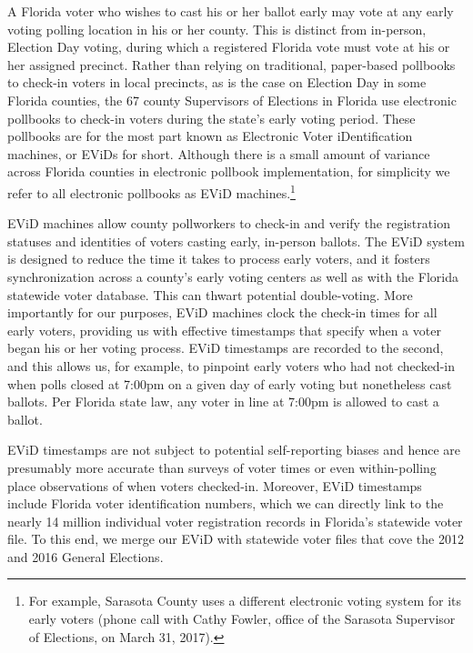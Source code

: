 \documentclass[12pt,titlepage]{article}
\begin{document}
A Florida voter who wishes to cast his or her ballot early may vote at
any early voting polling location in his or her county.  This is
distinct from in-person, Election Day voting, during which a
registered Florida vote must vote at his or her assigned precinct.
Rather than relying on traditional, paper-based pollbooks to check-in
voters in local precincts, as is the case on Election Day in some
Florida counties, the 67 county Supervisors of Elections in Florida
use electronic pollbooks to check-in voters during the state's early
voting period.  These pollbooks are for the most part known as
Electronic Voter iDentification machines, or EViDs for short.
Although there is a small amount of variance across Florida counties
in electronic pollbook implementation, for simplicity we refer to all
electronic pollbooks as EViD machines.\footnote{For example, Sarasota
  County uses a different electronic voting system for its early
  voters (phone call with Cathy Fowler, office of the Sarasota
  Supervisor of Elections, on March 31, 2017).}


EViD machines allow county pollworkers to check-in and verify the
registration statuses and identities of voters casting early,
in-person ballots. The EViD system is designed to reduce the time it
takes to process early voters, and it fosters synchronization across a
county's early voting centers as well as with the Florida statewide
voter database.  This can thwart potential double-voting.  More
importantly for our purposes, EViD machines clock the check-in times
for all early voters, providing us with effective timestamps that
specify when a voter began his or her voting process. EViD timestamps
are recorded to the second, and this allows us, for example, to
pinpoint early voters who had not checked-in when polls closed at
7:00pm on a given day of early voting but nonetheless cast ballots.
Per Florida state law, any voter in line at 7:00pm is allowed to cast
a ballot.

EViD timestamps are not subject to potential self-reporting biases and
hence are presumably more accurate than surveys of voter times or even
within-polling place observations of when voters checked-in.
Moreover, EViD timestamps include Florida voter identification
numbers, which we can directly link to the nearly 14 million
individual voter registration records in Florida's statewide voter
file.  To this end, we merge our EViD with statewide voter files that
cove the 2012 and 2016 General Elections.
\end{document}
